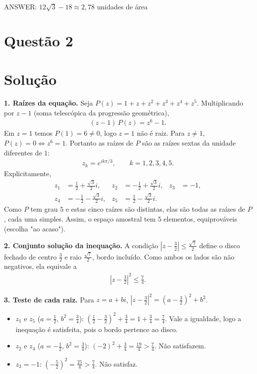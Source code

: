 \documentclass{article}%
\begin{document}
ANSWER: $12\sqrt{3}-18 \approx 2{,}78$ unidades de área%
\newpage%
\section*{Questão 2}

\section*{Solução}

\textbf{1. Raízes da equação.} Seja $P(z)=1+z+z^2+z^3+z^4+z^5$. Multiplicando por $z-1$ (soma telescópica da progressão geométrica),
\begin{align*}
(z-1)\,P(z) = z^6-1 .
\end{align*}
Em $z=1$ temos $P(1)=6\neq 0$, logo $z=1$ não é raiz. Para $z\neq 1$, $P(z)=0 \iff z^6=1$. Portanto as raízes de $P$ são as raízes sextas da unidade diferentes de $1$:
\begin{align*}
z_k = e^{ik\pi/3}, \qquad k=1,2,3,4,5 .
\end{align*}
Explicitamente,
\begin{align*}
z_1 &= \frac12+\frac{\sqrt{3}}{2}i, & z_2 &= -\frac12+\frac{\sqrt{3}}{2}i, & z_3 &= -1, \\
z_4 &= -\frac12-\frac{\sqrt{3}}{2}i, & z_5 &= \frac12-\frac{\sqrt{3}}{2}i .
\end{align*}
Como $P$ tem grau $5$ e estas cinco raízes são distintas, elas são todas as raízes de $P$, cada uma simples. Assim, o espaço amostral tem $5$ elementos, equiprováveis (escolha "ao acaso").

\textbf{2. Conjunto solução da inequação.} A condição $\left|z-\frac32\right|\le\frac{\sqrt7}{2}$ define o disco fechado de centro $\frac32$ e raio $\frac{\sqrt7}{2}$, bordo incluído. Como ambos os lados são não negativos, ela equivale a
\begin{align*}
\left|z-\frac32\right|^2\le\frac74 .
\end{align*}

\textbf{3. Teste de cada raiz.} Para $z=a+bi$, $\left|z-\frac32\right|^2=\left(a-\frac32\right)^2+b^2$.
\begin{itemize}
\item $z_1$ e $z_5$ ($a=\frac12$, $b^2=\frac34$): $\left(\frac12-\frac32\right)^2+\frac34=1+\frac34=\frac74$. Vale a igualdade, logo a inequação é satisfeita, pois o bordo pertence ao disco.
\item $z_2$ e $z_4$ ($a=-\frac12$, $b^2=\frac34$): $(-2)^2+\frac34=\frac{19}{4}>\frac74$. Não satisfazem.
\item $z_3=-1$: $\left(-\frac52\right)^2=\frac{25}{4}>\frac74$. Não satisfaz.
\end{itemize}
\end{document}
